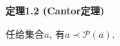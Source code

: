 \documentclass[UTF8]{ctexart}
\begin{document}

\vspace{15pt}

\hypertarget{sec:定理1.2}{}
\noindent\textbf{定理1.2 (Cantor定理)}

任给集合$a$, 有$a\prec\mathcal{P}(a)$.

\end{document}
